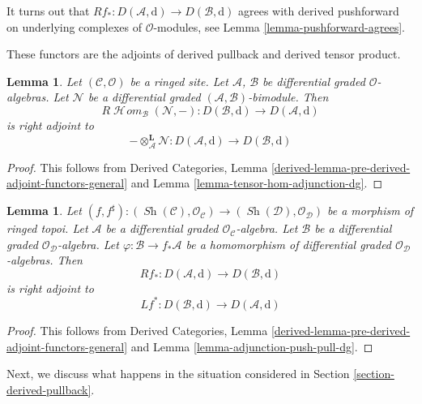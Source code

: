 \documentclass{stacks-project}
\theoremstyle{plain}
\newtheorem{lemma}[subsection]{Lemma}
\theoremstyle{definition}
\theoremstyle{remark}
\numberwithin{equation}{subsection}
\def\SheafHom{\mathop{\mathcal{H}\!\mathit{om}}\nolimits}
\def\Sh{\mathop{\mathit{Sh}}\nolimits}
\begin{document}
\noindent
It turns out that
$Rf_* : D(\mathcal{A}, \text{d}) \to D(\mathcal{B}, \text{d})$
agrees with derived pushforward on underlying complexes
of $\mathcal{O}$-modules, see Lemma \ref{lemma-pushforward-agrees}.

\medskip\noindent
These functors are the adjoints of derived pullback and
derived tensor product.

\begin{lemma}
\label{lemma-derived-adjoint-tensor-hom}
Let $(\mathcal{C}, \mathcal{O})$ be a ringed site. Let
$\mathcal{A}$, $\mathcal{B}$ be differential graded $\mathcal{O}$-algebras.
Let $\mathcal{N}$ be a  differential graded
$(\mathcal{A}, \mathcal{B})$-bimodule. Then
$$
R\SheafHom_\mathcal{B}(\mathcal{N}, -) :
D(\mathcal{B}, \text{d})
\longrightarrow
D(\mathcal{A}, \text{d})
$$
is right adjoint to
$$
- \otimes_\mathcal{A}^\mathbf{L} \mathcal{N} :
D(\mathcal{A}, \text{d})
\longrightarrow
D(\mathcal{B}, \text{d})
$$
\end{lemma}

\begin{proof}
This follows from Derived Categories, Lemma
\ref{derived-lemma-pre-derived-adjoint-functors-general}
and Lemma \ref{lemma-tensor-hom-adjunction-dg}.
\end{proof}

\begin{lemma}
\label{lemma-derived-adjoint-push-pull}
Let $(f, f^\sharp) : (\Sh(\mathcal{C}), \mathcal{O}_\mathcal{C})
\to (\Sh(\mathcal{D}), \mathcal{O}_\mathcal{D})$
be a morphism of ringed topoi. Let $\mathcal{A}$ be a differential
graded $\mathcal{O}_\mathcal{C}$-algebra. Let $\mathcal{B}$ be a
differential graded $\mathcal{O}_\mathcal{D}$-algebra. Let
$\varphi : \mathcal{B} \to f_*\mathcal{A}$ be a homomorphism
of differential graded $\mathcal{O}_\mathcal{D}$-algebras.
Then
$$
Rf_* : 
D(\mathcal{A}, \text{d})
\longrightarrow
D(\mathcal{B}, \text{d})
$$
is right adjoint to
$$
Lf^* :
D(\mathcal{B}, \text{d})
\longrightarrow
D(\mathcal{A}, \text{d})
$$
\end{lemma}

\begin{proof}
This follows from Derived Categories, Lemma
\ref{derived-lemma-pre-derived-adjoint-functors-general}
and Lemma \ref{lemma-adjunction-push-pull-dg}.
\end{proof}

\noindent
Next, we discuss what happens in the situation considered in
Section \ref{section-derived-pullback}.
\end{document}
